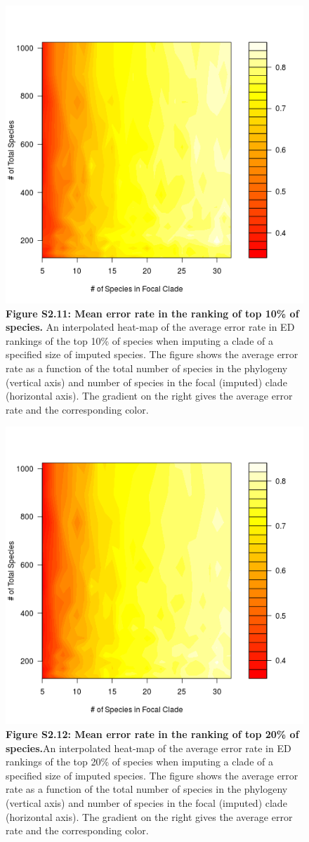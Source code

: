 \documentclass[10pt,english]{article}
\begin{document}
\begin{figure}[!ht]
  \center
  \includegraphics[width=.5\textwidth]{../figures/errorRate10pct.png}
  \caption*{\textbf{Figure S2.11: Mean error rate in the ranking of top 10\% of
  species.} An interpolated heat-map of the average error rate in ED rankings of
  the top 10\% of species when imputing a clade of a specified size of imputed
  species. The figure shows the average error rate as a function of the total
  number of species in the phylogeny (vertical axis) and number of species in
  the focal (imputed) clade (horizontal axis). The gradient on the right gives
  the average error rate and the corresponding color.}
\end{figure}

\begin{figure}[!ht]
  \center
  \includegraphics[width=.5\textwidth]{../figures/errorRate20pct.png}
  \caption*{\textbf{Figure S2.12: Mean error rate in the ranking of top 20\% of
  species.}An interpolated heat-map of the average error rate in ED rankings of
  the top 20\% of species when imputing a clade of a specified size of imputed
  species. The figure shows the average error rate as a function of the total
  number of species in the phylogeny (vertical axis) and number of species in
  the focal (imputed) clade (horizontal axis). The gradient on the right gives
  the average error rate and the corresponding color.}
\end{figure}
\clearpage
\end{document}
